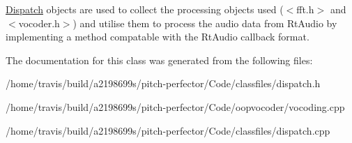 \hyperlink{classDispatch}{Dispatch} objects are used to collect the processing objects used ($<$fft.\-h$>$ and $<$vocoder.\-h$>$) and utilise them to process the audio data from Rt\-Audio by implementing a method compatable with the Rt\-Audio callback format. 

The documentation for this class was generated from the following files\-:\begin{DoxyCompactItemize}
\item 
/home/travis/build/a2198699s/pitch-\/perfector/\-Code/classfiles/dispatch.\-h\item 
/home/travis/build/a2198699s/pitch-\/perfector/\-Code/oopvocoder/vocoding.\-cpp\item 
/home/travis/build/a2198699s/pitch-\/perfector/\-Code/classfiles/dispatch.\-cpp\end{DoxyCompactItemize}
